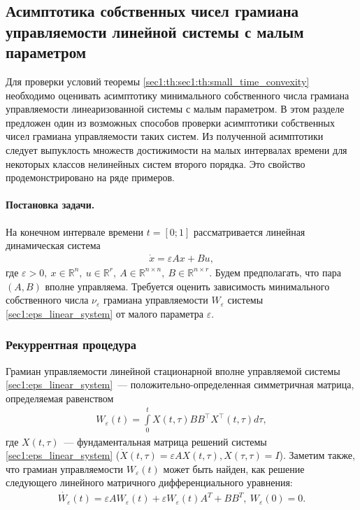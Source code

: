 \documentclass[../main.tex]{subfiles}
\begin{document}
 \subsection{Асимптотика собственных чисел грамиана управляемости линейной системы с малым параметром} 
Для проверки условий теоремы \ref{sec1:th:sec1:th:small_time_convexity} необходимо оценивать асимптотику минимального собственного числа грамиана управляемости линеаризованной системы с малым параметром.
В этом разделе предложен один из возможных способов проверки асимптотики собственных чисел грамиана управляемости таких систем.
Из полученной асимптотики следует выпуклость множеств достижимости на малых интервалах времени для некоторых классов нелинейных систем второго порядка.
Это свойство продемонстрировано на ряде примеров.

\paragraph{Постановка задачи.} На конечном интервале времени $ t = [0;1] $ рассматривается линейная динамическая система 
\begin{gather}\label{sec1:eps_linear_system}
     \dot{x} = \varepsilon A x + Bu, 
\end{gather}
где $ \varepsilon > 0, \ x \in \mathbb{R}^n, \ u \in \mathbb{R}^r, \ A \in \mathbb{R}^{n\times n}, \ B \in \mathbb{R}^{n\times r}  $.
Будем предполагать, что пара $ \left( A, B\right)  $ вполне управляема.
Требуется оценить зависимость минимального собственного числа $ \nu_{\varepsilon} $ грамиана управляемости $ W_{\varepsilon} $ системы \eqref{sec1:eps_linear_system} от малого параметра $ \varepsilon  $.
\subsubsection{Рекуррентная процедура}
Грамиан управляемости линейной стационарной вполне управляемой системы \eqref{sec1:eps_linear_system}~--- положительно-определенная симметричная матрица, определяемая равенством
\begin{gather*}
    W_{\varepsilon}(t) = \int \limits_0^t X(t,\tau) B B^{\top} X^{\top}(t,\tau) d\tau,
\end{gather*}
где $ X(t,\tau) $~--- фундаментальная матрица решений системы \eqref{sec1:eps_linear_system} ($  \dot{X}(t,\tau) = \varepsilon A X(t,\tau), X(\tau,\tau) = I  $).
Заметим также, что грамиан управляемости $ W_{\varepsilon}(t) $ может быть найден, как решение следующего линейного матричного дифференциального уравнения:
\begin{gather}\label{sec1:gram}
    \dot{W_{\varepsilon}}(t) = \varepsilon A W_{\varepsilon}(t) + \varepsilon W_{\varepsilon}(t) A^T + BB^T, \ W_{\varepsilon}(0) = 0.
\end{gather}
 
\end{document}
